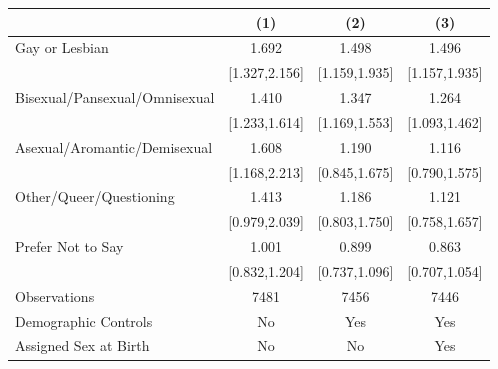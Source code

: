 \begin{tabular}{lccc}
\toprule
                    &\multicolumn{1}{c}{(1)}         &\multicolumn{1}{c}{(2)}         &\multicolumn{1}{c}{(3)}         \\
\midrule
 Gay or Lesbian&                 1.692\sym{***}&                 1.498\sym{***}&                 1.496\sym{***}\\
                    &         [1.327,2.156]         &         [1.159,1.935]         &         [1.157,1.935]         \\
\addlinespace
 Bisexual/Pansexual/Omnisexual&                 1.410\sym{***}&                 1.347\sym{***}&                 1.264\sym{***}\\
                    &         [1.233,1.614]         &         [1.169,1.553]         &         [1.093,1.462]         \\
\addlinespace
 Asexual/Aromantic/Demisexual&                 1.608\sym{***}&                 1.190         &                 1.116         \\
                    &         [1.168,2.213]         &         [0.845,1.675]         &         [0.790,1.575]         \\
\addlinespace
 Other/Queer/Questioning&                 1.413\sym{*}  &                 1.186         &                 1.121         \\
                    &         [0.979,2.039]         &         [0.803,1.750]         &         [0.758,1.657]         \\
\addlinespace
 Prefer Not to Say&                 1.001         &                 0.899         &                 0.863         \\
                    &         [0.832,1.204]         &         [0.737,1.096]         &         [0.707,1.054]         \\
\midrule
Observations        &                  7481         &                  7456         &                  7446         \\
Demographic Controls&                    No         &                   Yes         &                   Yes         \\
Assigned Sex at Birth&                    No         &                    No         &                   Yes         \\
\bottomrule
\end{tabular}
